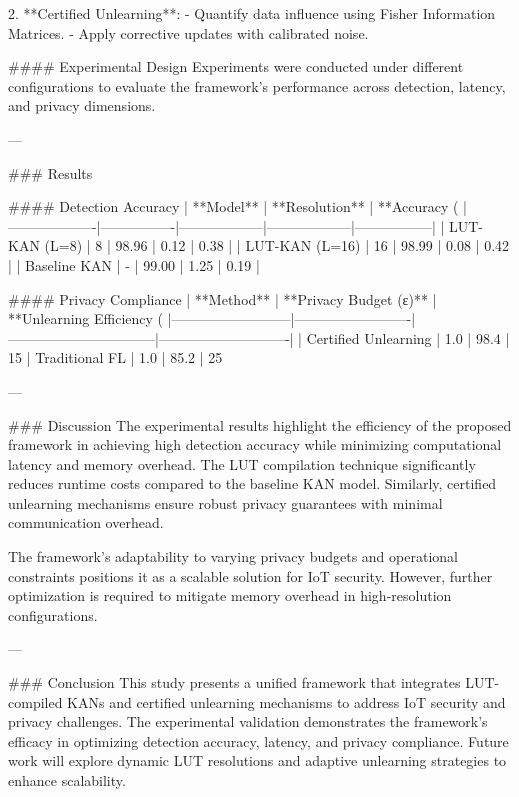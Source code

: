 2. **Certified Unlearning**:
   - Quantify data influence using Fisher Information Matrices.
   - Apply corrective updates with calibrated noise.

#### Experimental Design  
Experiments were conducted under different configurations to evaluate the framework's performance across detection, latency, and privacy dimensions.

---

### Results  

#### Detection Accuracy  
| **Model**        | **Resolution** | **Accuracy (%
|-------------------|----------------|------------------|------------------|-----------------|  
| LUT-KAN (L=8)    | 8              | 98.96            | 0.12             | 0.38            |  
| LUT-KAN (L=16)   | 16             | 98.99            | 0.08             | 0.42            |  
| Baseline KAN     | -              | 99.00            | 1.25             | 0.19            |  

#### Privacy Compliance  
| **Method**              | **Privacy Budget (ε)** | **Unlearning Efficiency (%
|--------------------------|-------------------------|--------------------------------|----------------------------|  
| Certified Unlearning    | 1.0                    | 98.4                          | 15%
| Traditional FL          | 1.0                    | 85.2                          | 25%

---

### Discussion  
The experimental results highlight the efficiency of the proposed framework in achieving high detection accuracy while minimizing computational latency and memory overhead. The LUT compilation technique significantly reduces runtime costs compared to the baseline KAN model. Similarly, certified unlearning mechanisms ensure robust privacy guarantees with minimal communication overhead.

The framework's adaptability to varying privacy budgets and operational constraints positions it as a scalable solution for IoT security. However, further optimization is required to mitigate memory overhead in high-resolution configurations.

---

### Conclusion  
This study presents a unified framework that integrates LUT-compiled KANs and certified unlearning mechanisms to address IoT security and privacy challenges. The experimental validation demonstrates the framework's efficacy in optimizing detection accuracy, latency, and privacy compliance. Future work will explore dynamic LUT resolutions and adaptive unlearning strategies to enhance scalability.

